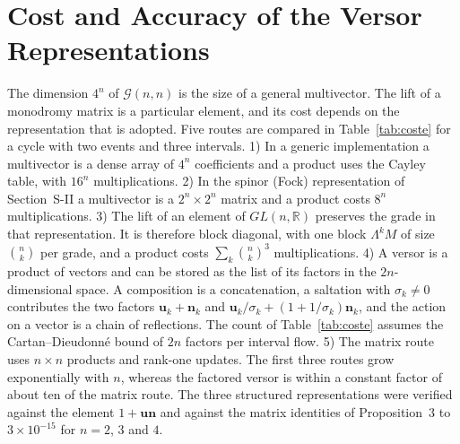 \documentclass[journal]{IEEEtran}
\newcommand{\Gnn}{\mathcal{G}(n,n)}
\begin{document}
\section{Cost and Accuracy of the Versor Representations}
The dimension $4^{n}$ of $\Gnn$ is the size of a general multivector. The
lift of a monodromy matrix is a particular element, and its cost depends on
the representation that is adopted. Five routes are compared in
Table~\ref{tab:coste} for a cycle with two events and three intervals.
1) In a generic implementation a multivector is a dense array of $4^{n}$
coefficients and a product uses the Cayley table, with $16^{n}$
multiplications. 2) In the spinor (Fock) representation of Section~S-II a
multivector is a $2^{n}\times2^{n}$ matrix and a product costs $8^{n}$
multiplications. 3) The lift of an element of $GL(n,\mathbb{R})$ preserves
the grade in that representation. It is therefore block diagonal, with one
block $\Lambda^{k}M$ of size $\binom{n}{k}$ per grade, and a product costs
$\sum_k\binom{n}{k}^{3}$ multiplications. 4) A versor is a product of
vectors and can be stored as the list of its factors in the
$2n$-dimensional space. A composition is a concatenation, a saltation with
$\sigma_k\neq0$ contributes the two factors $\bm{u}_k+\bm{n}_k$ and
$\bm{u}_k/\sigma_k+(1+1/\sigma_k)\bm{n}_k$, and the action on a vector is a
chain of reflections. The count of Table~\ref{tab:coste} assumes the
Cartan--Dieudonn\'e bound of $2n$ factors per interval flow. 5) The matrix
route uses $n\times n$ products and rank-one updates. The first three
routes grow exponentially with $n$, whereas the factored versor is within a
constant factor of about ten of the matrix route. The three structured
representations were verified against the element $1+\bm{u}\bm{n}$ and
against the matrix identities of Proposition~3 to $3\times10^{-15}$ for
$n=2$, $3$ and $4$.
\end{document}
